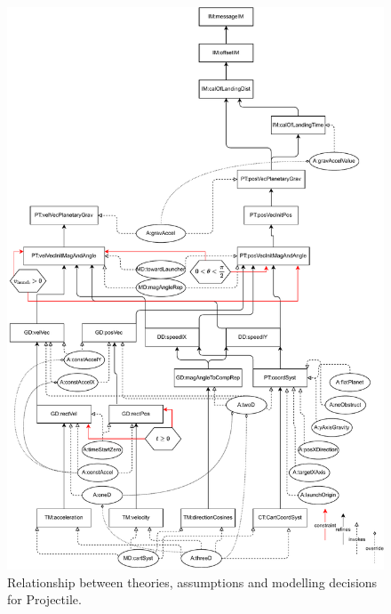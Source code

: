 \documentclass[12pt]{article}
\begin{document}
\begin{figure} 
\caption{Relationship between theories, assumptions and modelling decisions for
Projectile.} \label{Fig:RelateTM2A2MD}
\begin{center}
\includegraphics[scale=0.6]{ProjectileTheoriesAssumpts.drawio.pdf}        
\end{center}
\end{figure}
\end{document}
